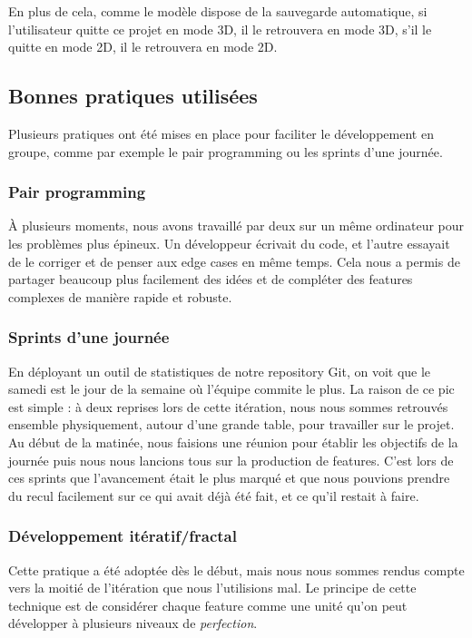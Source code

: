 	En plus de cela, comme le modèle dispose de la sauvegarde automatique, 
	si l'utilisateur quitte ce projet en mode 3D, il le retrouvera en mode 3D,
	s'il le quitte en mode 2D, il le retrouvera en mode 2D.

\subsection{Bonnes pratiques utilisées}
Plusieurs pratiques ont été mises en place pour faciliter le développement en 
groupe, comme par exemple le pair programming ou les sprints d'une journée.

	\subsubsection{Pair programming}
	\`A plusieurs moments, nous avons travaillé par deux sur un même ordinateur pour
	les problèmes plus épineux. Un développeur écrivait du code, et l'autre essayait
	de le corriger et de penser aux edge cases en même temps. Cela nous a permis de 
	partager beaucoup plus facilement des idées et de compléter des features
	complexes de manière rapide et robuste.

	\subsubsection{Sprints d'une journée}
	En déployant un outil de statistiques de notre repository Git, on voit que le 
	samedi est le jour de la semaine où l'équipe commite le plus. La raison de ce 
	pic est simple : à deux reprises lors de cette itération, nous nous sommes
	retrouvés ensemble physiquement, autour d'une grande table, pour travailler sur
	le projet. \\

	Au début de la matinée, nous faisions une réunion pour établir les
	objectifs de la journée puis nous nous lancions tous sur la production de
	features. C'est lors de ces sprints que l'avancement était le plus marqué et 
	que nous pouvions prendre du recul facilement sur ce qui avait déjà été fait, 
	et ce qu'il restait à faire.

	\subsubsection{Développement itératif/fractal}
	Cette pratique a été adoptée dès le début, mais nous nous sommes rendus compte
	vers la moitié de l'itération que nous l'utilisions mal. Le principe de cette
	technique est de considérer chaque feature comme une unité qu'on peut développer
	à plusieurs niveaux de \textit{perfection}. \\

